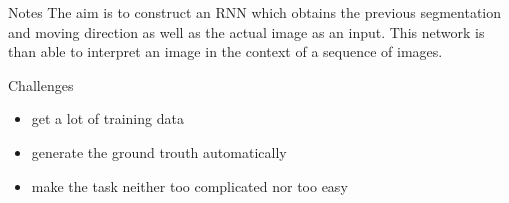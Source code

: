 \begin{frame}[beamer:0]{Notes}
The aim is to construct an RNN which obtains the previous segmentation and moving direction as well as the actual image as an input. This network is than able to interpret an image in the context of a sequence of images.
\end{frame}

\begin{frame}{Challenges}
\begin{itemize}
\item get a lot of training data
\item generate the ground trouth automatically
\item make the task neither too complicated nor too easy
\end{itemize}
\end{frame}

